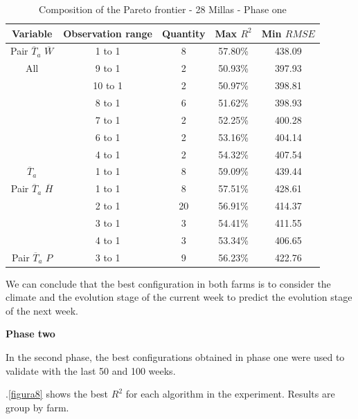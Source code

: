 \documentclass[review]{elsarticle}
\begin{document}
\begin{table}[h] 
\caption{Composition of the Pareto frontier - 28 Millas - Phase one} 
\label{tabla3} 
\centering
\begin{tabular}{c|c|c|c|c} 
\hline
\bfseries Variable & \bfseries Observation range & \bfseries Quantity & \bfseries Max $R^2$ & \bfseries Min $RMSE$\\ 
\hline\hline 
Pair $\overline{T}_{a}$ $\overline{W}$ & 1 to 1 & 8 & 57.80\% & 438.09 \\
\hline 
All   &	9 to 1 & 2 & 50.93\% & 397.93 \\
  & 10 to 1	 & 2 & 50.97\% & 398.81 \\
  &	8 to 1 & 6 & 51.62\% & 398.93 \\
  &	7 to 1 & 2 & 52.25\% & 400.28 \\
  &	6 to 1 & 2 & 53.16\% & 404.14 \\
  &	4 to 1 & 2 & 54.32\% & 407.54 \\
\hline    
$\overline{T}_{a}$ & 1 to 1  & 8  & 59.09\% & 439.44 \\
\hline
Pair $\overline{T}_{a}$ $\overline{H}$ & 1 to 1	 & 8 & 57.51\% & 428.61 \\
 &	2 to 1 & 20 & 56.91\% & 414.37 \\
 &	3 to 1 & 3 & 54.41\% & 411.55 \\
 &	4 to 1 & 3 & 53.34\% & 406.65 \\
\hline
Pair $\overline{T}_{a}$ $P$ & 3 to 1 & 9 & 56.23\% & 422.76 \\
\hline
\end{tabular} 
\end{table}

We can conclude that the best configuration in both farms is to consider the climate and the evolution stage of the current week to predict the evolution stage of the next week.


{\bf Phase two }

In the second phase, the best configurations obtained in phase one were used to validate with the last 50 and 100 weeks. 


\figurename $.$\ref{figura8} shows the best $R^2$ for each algorithm in the experiment. Results are group by farm.
\end{document}
